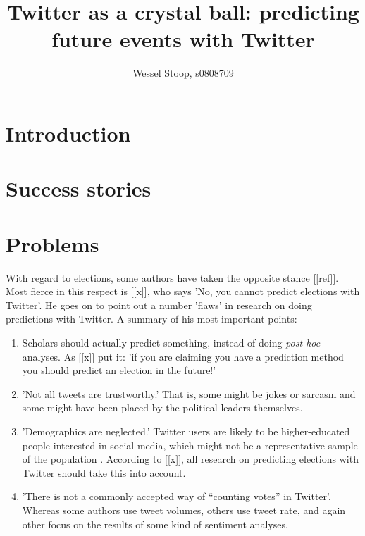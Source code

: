 \documentclass[12pt]{article}
\title{Twitter as a crystal ball: predicting future events with Twitter}
\author{Wessel Stoop, s0808709}
\begin{document}
\maketitle

\section{Introduction}


\section{Success stories}



\section{Problems}

With regard to elections, some authors have taken the opposite stance [[ref]]. Most fierce in this respect is [[x]], who says 'No, you cannot predict elections with Twitter'. He goes on to point out a number 'flaws' in research on doing predictions with Twitter. A summary of his most important points:

\begin{enumerate}
\item Scholars should actually predict something, instead of doing \emph{post-hoc} analyses. As [[x]] put it: 'if you are claiming you have a prediction method you should predict an election in the future!'
\item 'Not all tweets are trustworthy.' That is, some might be jokes or sarcasm and some might have been placed by the political leaders themselves.
\item 'Demographics are neglected.' Twitter users are likely to be higher-educated people interested in social media, which might not be a representative sample of the population . According to [[x]], all research on predicting elections with Twitter should take this into account.
\item 'There is not a commonly accepted way of “counting votes” in Twitter'. Whereas some authors use tweet volumes, others use tweet rate, and again other focus on the results of some kind of sentiment analyses.
\end{enumerate}
\end{document}

